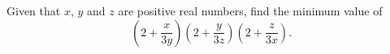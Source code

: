 Given that $x$, $y$ and $z$ are positive real numbers, find the minimum value of
\[\left(2+\dfrac{x}{3y}\right)\left(2+\dfrac{y}{3z}\right)\left(2+\dfrac{z}{3x}\right).\]
